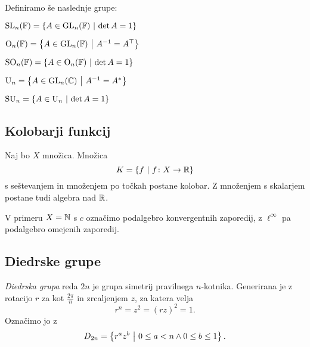 \begin{definicija}
Definiramo še naslednje grupe:

\begin{description}[labelwidth=\widthof{\bfseries Posebna ortogonalna:}]
\item[Posebna linearna:]
$\operatorname{SL}_n(\mathbb{F}) = \left\{A \in \operatorname{GL}_n(\mathbb{F})~\middle\vert~\det A = 1\right\}$
\item[Ortogonalna:]
$\operatorname{O}_n(\mathbb{F}) = \left\{A \in \operatorname{GL}_n(\mathbb{F})~\middle\vert~A^{-1} = A^\top\right\}$
\item[Posebna ortogonalna:]
$\operatorname{SO}_n(\mathbb{F}) =
\left\{A \in \operatorname{O}_n(\mathbb{F})~\middle\vert~\det A = 1\right\}$
\item[Unitarna:]
$\operatorname{U}_n = \left\{A \in \operatorname{GL}_n(\mathbb{C})~\middle\vert~A^{-1} = A^*\right\}$
\item[Posebna unitarna:]
$\operatorname{SU}_n =
\left\{A \in \operatorname{U}_n~\middle\vert~\det A = 1\right\}$
\end{description}
\end{definicija}

\newpage

\subsection{Kolobarji funkcij}

\begin{definicija}
Naj bo $X$ množica. Množica
\[
K = \left\{f~\middle\vert~f \colon X \to \mathbb{R}\right\}
\]
s seštevanjem in množenjem po točkah postane kolobar. Z množenjem
s skalarjem postane tudi algebra nad $\mathbb{R}$.
\end{definicija}

\begin{definicija}
V primeru $X = \mathbb{N}$ s $c$ označimo podalgebro konvergentnih
zaporedij, z $\ell^\infty$ pa podalgebro omejenih zaporedij.
\end{definicija}

\newpage

\subsection{Diedrske grupe}


\begin{definicija}
\emph{Diedrska grupa} reda $2n$ je grupa
simetrij pravilnega $n$-kotnika. Generirana je z rotacijo $r$ za
kot $\frac{2\pi}{n}$ in zrcaljenjem $z$, za katera velja
\[
r^n = z^2 = (rz)^2 = 1.
\]
Označimo jo z
\[
D_{2n} = \left\{r^a z^b~\middle\vert~0 \leq a < n \land 0 \leq b \leq 1\right\}.
\]
\end{definicija}

